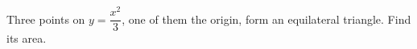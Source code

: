 Three points on $y=\dfrac{x^2}{3}$, one of them the origin, form an equilateral triangle. Find its area.
